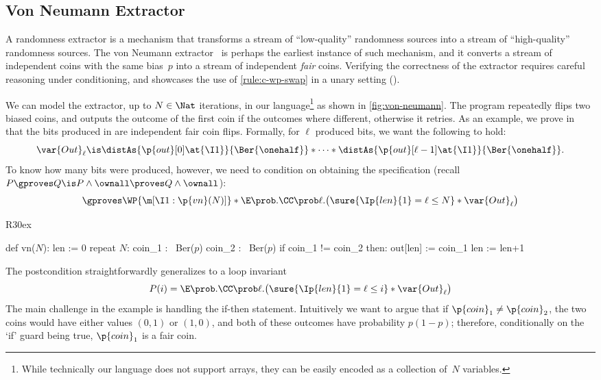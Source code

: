 \documentclass[acmsmall,nonacm,screen,appendix]{acmart}
\begin{document}
\subsection{Von Neumann Extractor}
\label{sec:ex:von-neumann}

A randomness extractor is a mechanism that transforms a stream of
``low-quality'' randomness sources into a stream of ``high-quality''
randomness sources.
The von Neumann extractor~\cite{vonNeumann}
is perhaps the earliest instance of such mechanism,
and it converts a stream of independent coins with the same bias~$p$
into a stream of independent \emph{fair} coins.
Verifying the correctness of the extractor requires careful reasoning
under conditioning, and showcases the use of \cref{rule:c-wp-swap} in a
unary setting ().

We can model the extractor, up to $N \in \Nat$ iterations, in our language\footnote{While technically our language does not support arrays,
  they can be easily encoded as a collection of~$N$ variables.
}
as shown in \cref{fig:von-neumann}.
The program repeatedly flips two biased coins, and outputs the outcome of the first coin if the outcomes where different, otherwise it retries.
As an example, we prove in \thelogic~ that the bits produced in  are independent fair coin flips.
Formally, for $\ell$ produced bits, we want the following to hold:
\[
  \var{Out}_\ell \is
  \distAs{\p{out}[0]\at{\I1}}{\Ber{\onehalf}} *
  \dots *
  \distAs{\p{out}[\ell-1]\at{\I1}}{\Ber{\onehalf}}.
\]
To know how many bits were produced, however,
we need to condition on 
obtaining the specification
(recall $ P \gproves Q \is P \land \ownall \proves Q \land \ownall $):
\[
  \gproves \WP {\m[\I1: \p{vn}(N)]}*{
    \E \prob. \CC \prob \ell. \bigl(
      \sure{\Ip{len}{1} = \ell \leq N} *
      \var{Out}_\ell
    \bigr)
  }
\]

\begin{wrapfigure}[12]{R}{30ex}\begin{sourcecode*}[gobble=2,aboveskip=0pt,belowskip=0pt]
  def vn($N$):
    len := 0
    repeat $N$:
      coin_1 :~ Ber($p$)
      coin_2 :~ Ber($p$)
      if coin_1 != coin_2 then:
        out[len] := coin_1
        len := len+1
  \end{sourcecode*}
  \caption{Von Neumann extractor.}
  \label{fig:von-neumann}
\end{wrapfigure}

The postcondition straightforwardly generalizes to a loop invariant
\[
  P(i) =
  \E \prob. \CC \prob \ell. \bigl(
    \sure{\Ip{len}{1} = \ell \leq i} *
    \var{Out}_\ell
  \bigr)
\]
The main challenge in the example is handling the if-then statement.
Intuitively we want to argue that if $ \p{coin}_1 \ne \p{coin}_2 $,
the two coins would have either values $(0,1)$ or $(1,0)$,
and both of these outcomes have probability $ p(1-p) $;
therefore,
conditionally on the `if' guard being true,
$\p{coin}_1$ is a fair coin.
\end{document}

